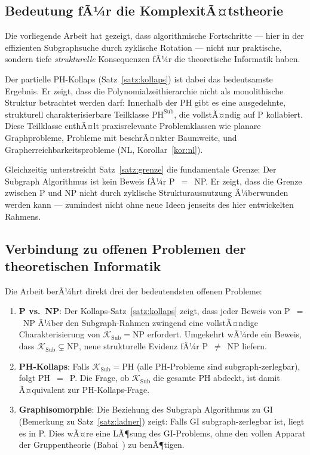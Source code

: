 ﻿\documentclass[a4paper,12pt]{article}
\theoremstyle{definition}
\begin{document}
\subsection{Bedeutung fÃ¼r die KomplexitÃ¤tstheorie}

Die vorliegende Arbeit hat gezeigt, dass algorithmische Fortschritte ---
hier in der effizienten Subgraphsuche durch zyklische Rotation ---
nicht nur praktische, sondern tiefe \emph{strukturelle} Konsequenzen fÃ¼r
die theoretische Informatik haben.

Der partielle PH-Kollaps (Satz~\ref{satz:kollaps}) ist dabei das bedeutsamste
Ergebnis. Er zeigt, dass die Polynomialzeithierarchie nicht als monolithische
Struktur betrachtet werden darf: Innerhalb der PH gibt es eine ausgedehnte,
strukturell charakterisierbare Teilklasse $\mathrm{PH}^{\mathrm{Sub}}$,
die vollstÃ¤ndig auf P kollabiert. Diese Teilklasse enthÃ¤lt praxisrelevante
Problemklassen wie planare Graphprobleme, Probleme mit beschrÃ¤nkter Baumweite,
und Grapherreichbarkeitsprobleme (NL, Korollar~\ref{kor:nl}).

Gleichzeitig unterstreicht Satz~\ref{satz:grenze} die fundamentale Grenze:
Der Subgraph Algorithmus ist kein Beweis fÃ¼r P~$=$~NP. Er zeigt, dass die
Grenze zwischen P und NP nicht durch zyklische Strukturausnutzung Ã¼berwunden
werden kann --- zumindest nicht ohne neue Ideen jenseits des hier entwickelten Rahmens.

\subsection{Verbindung zu offenen Problemen der theoretischen Informatik}

Die Arbeit berÃ¼hrt direkt drei der bedeutendsten offenen Probleme:

\begin{enumerate}
  \item \textbf{P vs.\ NP}: Der Kollaps-Satz~\ref{satz:kollaps} zeigt,
        dass jeder Beweis von P~$=$~NP Ã¼ber den Subgraph-Rahmen zwingend
        eine vollstÃ¤ndige Charakterisierung von $\mathcal{K}_\mathrm{Sub} = \mathrm{NP}$
        erfordert. Umgekehrt wÃ¼rde ein Beweis, dass $\mathcal{K}_\mathrm{Sub} \subsetneq \mathrm{NP}$,
        neue strukturelle Evidenz fÃ¼r P~$\neq$~NP liefern.

  \item \textbf{PH-Kollaps}: Falls $\mathcal{K}_\mathrm{Sub} = \mathrm{PH}$
        (alle PH-Probleme sind subgraph-zerlegbar), folgt PH~$=$~P.
        Die Frage, ob $\mathcal{K}_\mathrm{Sub}$ die gesamte PH abdeckt,
        ist damit Ã¤quivalent zur PH-Kollaps-Frage.

  \item \textbf{Graphisomorphie}: Die Beziehung des Subgraph Algorithmus
        zu GI (Bemerkung zu Satz~\ref{satz:ladner}) zeigt:
        Falls GI subgraph-zerlegbar ist, liegt es in P.
        Dies wÃ¤re eine LÃ¶sung des GI-Problems, ohne den vollen Apparat
        der Gruppentheorie (Babai~\cite{babai2016graph}) zu benÃ¶tigen.
\end{enumerate}
\end{document}
